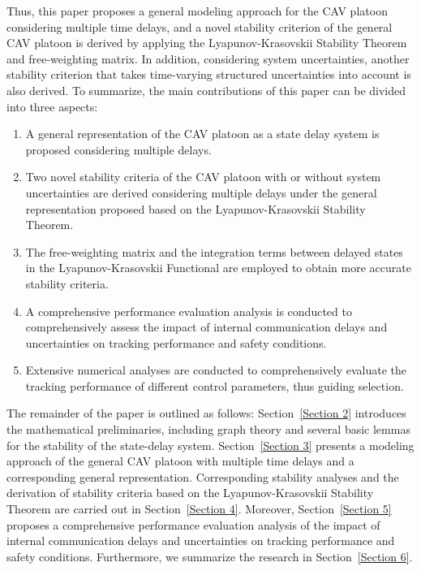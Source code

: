 \documentclass[a4paper]{cas-sc}
\begin{document}
Thus, this paper proposes a general modeling approach for the CAV platoon considering multiple time delays, and a novel stability criterion of the general CAV platoon is derived by applying the Lyapunov-Krasovskii Stability Theorem and free-weighting matrix. In addition, considering system uncertainties, another stability criterion that takes time-varying structured uncertainties into account is also derived. To summarize, the main contributions of this paper can be divided into three aspects:
\begin{enumerate}
  \item A general representation of the CAV platoon as a state delay system is proposed considering multiple delays.
  \item Two novel stability criteria of the CAV platoon with or without system uncertainties are derived considering multiple delays under the general representation proposed based on the Lyapunov-Krasovskii Stability Theorem.
  \item The free-weighting matrix and the integration terms between delayed states in the Lyapunov-Krasovskii Functional are employed to obtain more accurate stability criteria.
  \item A comprehensive performance evaluation analysis is conducted to comprehensively assess the impact of internal communication delays and uncertainties on tracking performance and safety conditions.
  \item Extensive numerical analyses are conducted to comprehensively evaluate the tracking performance of different control parameters, thus guiding selection.
\end{enumerate}

The remainder of the paper is outlined as follows: Section~\ref{Section 2} introduces the mathematical preliminaries, including graph theory and several basic lemmas for the stability of the state-delay system. Section~\ref{Section 3} presents a modeling approach of the general CAV platoon with multiple time delays and a corresponding general representation. Corresponding stability analyses and the derivation of stability criteria based on the Lyapunov-Krasovskii Stability Theorem are carried out in Section~\ref{Section 4}. Moreover, Section~\ref{Section 5} proposes a comprehensive performance evaluation analysis of the impact of internal communication delays and uncertainties on tracking performance and safety conditions. Furthermore, we summarize the research in Section~\ref{Section 6}.
\end{document}

